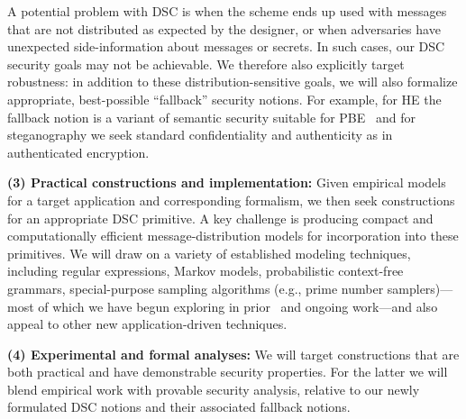 
A potential problem with DSC is when the scheme ends up used with messages
that are not distributed as expected by the designer, or when adversaries have
unexpected side-information about messages or secrets. In such cases, our DSC
security goals may not be achievable. We therefore also explicitly target
robustness: in addition to these distribution-sensitive
goals, we will also formalize appropriate, best-possible ``fallback'' security notions. 
For example, for HE the fallback notion
is a variant of semantic security suitable for PBE~\cite{bellare2012multi} and
for steganography we seek standard confidentiality and authenticity as in
  authenticated encryption.

\vspace{2mm}
\noindent \textbf{(3) Practical constructions and implementation:} Given 
empirical models for a target application and  corresponding formalism, 
we then seek constructions for an appropriate DSC
primitive.  A key challenge is producing
compact and computationally efficient message-distribution models for incorporation
into these primitives. We will draw on a
variety of established modeling techniques, including regular
expressions, Markov models, probabilistic context-free grammars, 
special-purpose sampling algorithms (e.g., prime number samplers)---most 
of which we have begun exploring in
prior~\cite{BRRS09,Dyer-2013,luchaup2014libfte,HoneyEnc-EC:2014,luchaup2014formatted} and ongoing
work\cite{GenoGuard:2014,SweetPass:2014}---and also appeal to other new application-driven techniques.
 
\vspace{2mm} \noindent \textbf{(4) Experimental and formal analyses:} We will
target constructions that are both practical and have demonstrable 
security properties. For the
latter we will blend empirical work with provable security analysis, relative to our
newly formulated DSC notions and their associated fallback notions.

